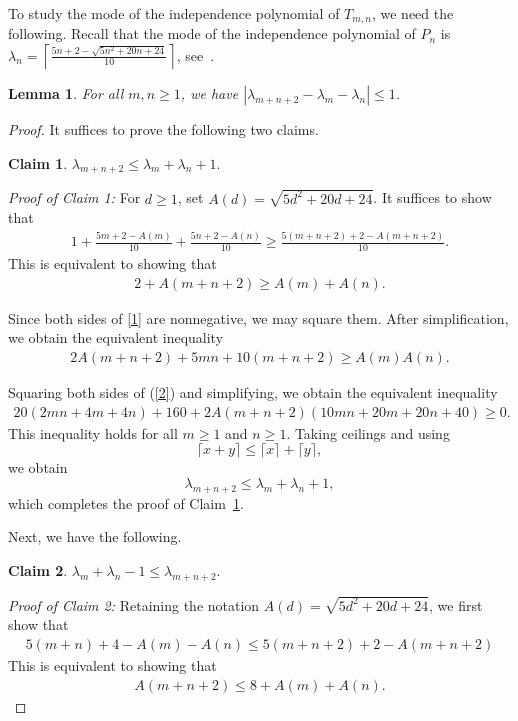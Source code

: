 \documentclass[12pt,twoside]{amsart}
\newtheorem{lemma}[thm]{Lemma}
\theoremstyle{definition}
\theoremstyle{mystyle}
\newtheorem{claim}{Claim}
\newcommand{\abs}[1]{\left| #1\right|}
\newcommand{\ceil}[1]{ \left \lceil #1 \right \rceil}
\begin{document}
To study the mode of the independence polynomial of $T_{m,n}$, we need the following. Recall that the mode of the independence polynomial of $P_n$ is $\lambda_n=\ceil{\frac{5n+2-\sqrt{5n^2+20n+24}}{10}}$, see~\cite[Proposition~3.1]{NT24b}.
\begin{lemma}\label{inequality_lambda}
For all $m,n\geq 1$, we have $\abs{\lambda_{m+n+2}-\lambda_m-\lambda_n}\leq 1$. 
\end{lemma}
\begin{proof}
It suffices to prove the following two claims.

\noindent\begin{claim}\label{claim 1}
    $\lambda_{m+n+2}\leq \lambda_m+\lambda_n+1$.
\end{claim}


\noindent\emph{Proof of Claim 1:}
For $d\geq 1$, set $A(d)= \sqrt{5d^2 + 20d+24}$. It suffices to show that
\begin{align*}
    1 + \frac{5m+2- A(m)}{10} + \frac{5n+2-A(n)}{10}\geq \frac{5(m+n+2)+2-A(m+n+2)}{10}.
\end{align*}
This is equivalent to showing that
\begin{align}
    2 + A(m+n+2)\geq A(m) + A(n). \label{1}
\end{align}

Since both sides of \eqref{1} are nonnegative, we may square them. After simplification, we obtain the equivalent inequality
\begin{align}
    2A(m+n+2)+5mn+10(m+n+2)
    \geq A(m)A(n).
    \label{2}
\end{align}

        
		Squaring both sides of (\ref{2}) and simplifying, we obtain the equivalent inequality
        \begin{align*}
            20(2mn + 4m+ 4n) + 160 + 2A(m+n+2)(10mn + 20m +20n +40)\geq 0.
        \end{align*}
		This inequality holds for all $m\geq 1$ and $n\geq 1$. Taking ceilings and using
$$\lceil x+y\rceil\leq\lceil x\rceil+\lceil y\rceil,$$ we obtain
\[
\lambda_{m+n+2}
\leq \lambda_m+\lambda_n+1,
\]
which completes the proof of Claim~\ref{claim 1}.
        
        Next, we have the following.
		

\noindent\begin{claim}\label{claim 2}
    $\lambda_m+\lambda_n-1\leq \lambda_{m+n+2}$.
\end{claim}

\noindent\emph{Proof of Claim 2:}		
Retaining the notation $A(d)= \sqrt{5d^2+20d+24}$, we first show that
\begin{align}
    5(m+n)+4- A(m) - A(n)\leq 5(m+n+2)+2 - A(m+n+2) \label{5}
\end{align}
This is equivalent to showing that
\begin{align}
     A(m+n+2)\leq 8 + A(m) + A(n). \label{3}
\end{align}


\end{proof}
\end{document}

